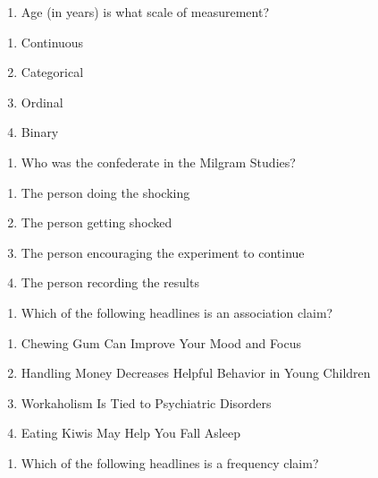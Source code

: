 \documentclass[
  12pt,
  letterpaper,
  DIV=11,
  numbers=noendperiod]{scrartcl}
\providecommand{\tightlist}{%
  \setlength{\itemsep}{0pt}\setlength{\parskip}{0pt}}\usepackage{longtable,booktabs,array}
\begin{document}
\begin{enumerate}
\def\labelenumi{\arabic{enumi}.}
\setcounter{enumi}{43}
\tightlist
\item
  Age (in years) is what scale of measurement?
\end{enumerate}

\begin{enumerate}
\def\labelenumi{\alph{enumi}.}
\tightlist
\item
  Continuous
\item
  Categorical
\item
  Ordinal
\item
  Binary
\end{enumerate}

\begin{enumerate}
\def\labelenumi{\arabic{enumi}.}
\setcounter{enumi}{44}
\tightlist
\item
  Who was the confederate in the Milgram Studies?
\end{enumerate}

\begin{enumerate}
\def\labelenumi{\alph{enumi}.}
\tightlist
\item
  The person doing the shocking
\item
  The person getting shocked
\item
  The person encouraging the experiment to continue
\item
  The person recording the results
\end{enumerate}

\begin{enumerate}
\def\labelenumi{\arabic{enumi}.}
\setcounter{enumi}{45}
\tightlist
\item
  Which of the following headlines is an association claim?
\end{enumerate}

\begin{enumerate}
\def\labelenumi{\alph{enumi}.}
\tightlist
\item
  Chewing Gum Can Improve Your Mood and Focus
\item
  Handling Money Decreases Helpful Behavior in Young Children
\item
  Workaholism Is Tied to Psychiatric Disorders
\item
  Eating Kiwis May Help You Fall Asleep
\end{enumerate}

\begin{enumerate}
\def\labelenumi{\arabic{enumi}.}
\setcounter{enumi}{46}
\tightlist
\item
  Which of the following headlines is a frequency claim?
\end{enumerate}
\end{document}
